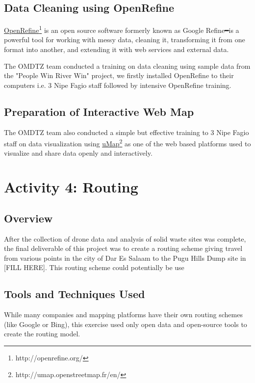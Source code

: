 \documentclass[a4paper,12pt,twoside]{article}
\begin{document}
\subsection{Data Cleaning using OpenRefine}

    \href{http://openrefine.org/}{OpenRefine}\footnote{http://openrefine.org/} is an open source software formerly known as Google Refine━is a powerful tool for working with messy data, cleaning it, transforming it from one format into another, and extending it with web services and external data.

    The OMDTZ team conducted a training on data cleaning using sample data from the "People Win River Win" project,  we firstly installed OpenRefine to their computers i.e. 3 Nipe Fagio staff followed by intensive OpenRefine training. 
\subsection{Preparation of Interactive Web Map}

    The OMDTZ team also conducted a simple but effective training to 3 Nipe Fagio staff on data visualization using \href{http://umap.openstreetmap.fr/en/}{uMap}\footnote{http://umap.openstreetmap.fr/en/}  as one of the  web based platforms used to visualize and share data openly and interactively.

\section{Activity 4: Routing}

\subsection{Overview}
    After the collection of drone data and analysis of solid waste sites was complete, the final deliverable of this project was to create a routing scheme giving travel from various points in the city of Dar Es Salaam to the Pugu Hills Dump site in [FILL HERE].  This routing scheme could potentially be use

\subsection{Tools and Techniques Used}
    While many companies and mapping platforms have their own routing schemes (like Google or Bing), this exercise used only open data and open-source tools to create the routing model. 
    
\end{document}
